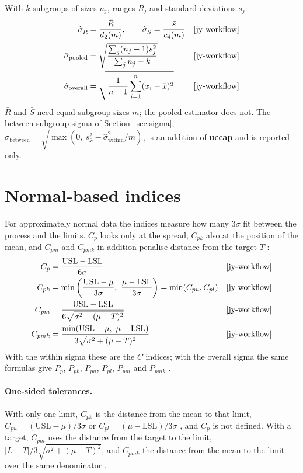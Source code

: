 \documentclass[a4paper,11pt,oneside,openany,parskip=half-,headings=standardclasses,toc=flat,numbers=noenddot]{scrbook}
\newcommand{\pkg}{\textsf{\bfseries uccap}}
\newcommand{\secref}[1]{Section~\ref{#1}}
\begin{document}
With $k$ subgroups of sizes $n_j$, ranges $R_j$ and standard deviations $s_j$:
\begin{align}
\hat\sigma_{\bar R} &= \frac{\bar R}{d_2(m)}, \qquad \hat\sigma_{\bar S} = \frac{\bar s}{c_4(m)} && \text{\cite[Eqs.~(31), (32)]{jy-workflow}}\label{eq:rbar}\\
\hat\sigma_{\text{pooled}} &= \sqrt{\frac{\sum_j (n_j-1)s_j^2}{\sum_j n_j - k}} && \text{\cite[Eq.~(33)]{jy-workflow}}\label{eq:pooled}\\
\hat\sigma_{\text{overall}} &= \sqrt{\frac{1}{n-1}\sum_{i=1}^{n}(x_i-\bar x)^2} && \text{\cite[Eq.~(35)]{jy-workflow}}\label{eq:overall}
\end{align}
$\bar R$ and $\bar S$ need equal subgroup sizes $m$; the pooled estimator does not. The between-subgroup sigma of
\secref{sec:sigma}, $\hat\sigma_{\text{between}} = \sqrt{\max(0,\ s_{\bar x}^2 - \hat\sigma_{\text{within}}^2/\bar m)}$, is an
addition of \pkg{} and is reported only.

\section{Normal-based indices}\label{app:f-normal}

For approximately normal data the indices measure how many $3\sigma$ fit between the process and the limits.
$C_p$ looks only at the spread, $C_{pk}$ also at the position of the mean, and $C_{pm}$ and $C_{pmk}$ in addition
penalise distance from the target $T$ \cite{chan}:
\begin{align}
C_p &= \frac{\mathrm{USL}-\mathrm{LSL}}{6\sigma} && \text{\cite[Eq.~(2)]{jy-workflow}}\label{eq:cp}\\
C_{pk} &= \min\left(\frac{\mathrm{USL}-\mu}{3\sigma},\ \frac{\mu-\mathrm{LSL}}{3\sigma}\right) = \min(C_{pu}, C_{pl}) && \text{\cite[Eq.~(4)]{jy-workflow}}\label{eq:cpk}\\
C_{pm} &= \frac{\mathrm{USL}-\mathrm{LSL}}{6\sqrt{\sigma^2+(\mu-T)^2}} && \text{\cite[Eq.~(8)]{jy-workflow}}\label{eq:cpm}\\
C_{pmk} &= \frac{\min(\mathrm{USL}-\mu,\ \mu-\mathrm{LSL})}{3\sqrt{\sigma^2+(\mu-T)^2}} && \text{\cite[Eq.~(12)]{jy-workflow}}\label{eq:cpmk}
\end{align}
With the within sigma these are the $C$ indices; with the overall sigma the same formulas give $P_p$, $P_{pk}$,
$P_{pu}$, $P_{pl}$, $P_{pm}$ and $P_{pmk}$ \cite[Eqs.~(16), (17)]{jy-workflow}.

\paragraph{One-sided tolerances.} With only one limit, $C_{pk}$ is the distance from the mean to that limit,
$C_{pu} = (\mathrm{USL}-\mu)/3\sigma$ or $C_{pl} = (\mu-\mathrm{LSL})/3\sigma$ \cite[Eqs.~(6), (7)]{jy-workflow}, and $C_p$ is not
defined. With a target, $C_{pm}$ uses the distance from the target to the limit, $|L-T|/3\sqrt{\sigma^2+(\mu-T)^2}$,
and $C_{pmk}$ the distance from the mean to the limit over the same denominator \cite[Eqs.~(10), (11), (14), (15)]{jy-workflow}.
\end{document}
